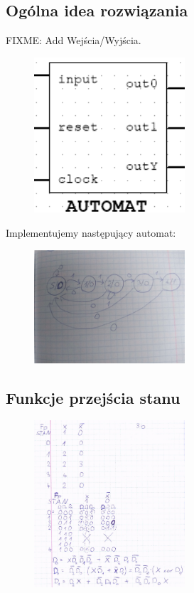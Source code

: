 \documentclass{article}
\begin{document}
\subsection{Ogólna idea rozwiązania}
FIXME: Add Wejścia/Wyjścia.
\begin{figure}[H]
\includegraphics[width = 0.5\textwidth]{3b_blackbox}
\end{figure}
Implementujemy następujący automat:
\begin{figure}[H]
\includegraphics[width = 0.5\textwidth]{3b_automat}
\end{figure}
\subsection{Funkcje przejścia stanu}
\begin{figure}[H]
\includegraphics[width = 0.5\textwidth]{3b_przejscia}
\end{figure}
\end{document}
